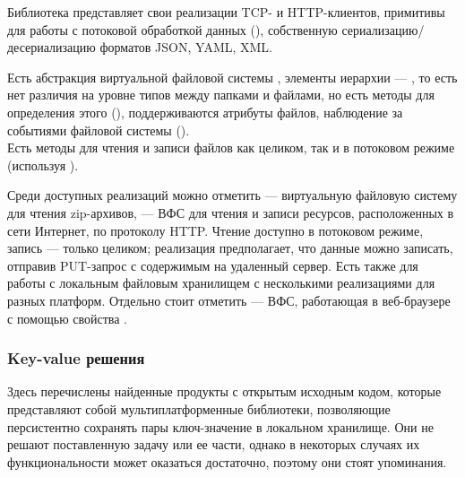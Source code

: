 \begin{itemize}
{        Библиотека представляет свои реализации TCP- и HTTP-клиентов, примитивы для работы с потоковой обработкой данных (), собственную сериализацию/десериализацию форматов JSON, YAML, XML.

        Есть абстракция виртуальной файловой системы , элементы иерархии --- , то есть нет различия на уровне типов между папками и файлами, но есть методы для определения этого (), поддерживаются атрибуты файлов, наблюдение за событиями файловой системы ().\\ Есть методы для чтения и записи файлов как целиком, так и в потоковом режиме (используя ).
        
        Среди доступных реализаций  можно отметить  --- виртуальную файловую систему для чтения zip-архивов,  --- ВФС для чтения и записи ресурсов, расположенных в сети Интернет, по протоколу HTTP. Чтение доступно в потоковом режиме, запись --- только целиком; реализация предполагает, что данные можно записать, отправив PUT-запрос с содержимым на удаленный сервер. Есть также  для работы с локальным файловым хранилищем с несколькими реализациями для разных платформ. Отдельно стоит отметить  --- ВФС, работающая в веб-браузере с помощью свойства .
      }
    \end{itemize}

  \subsubsection{Key-value решения}
    Здесь перечислены найденные продукты с открытым исходным кодом, которые представляют собой мультиплатформенные библиотеки, позволяющие персистентно сохранять пары ключ-значение в локальном хранилище. Они не решают поставленную задачу или ее части, однако в некоторых случаях их функциональности может оказаться достаточно, поэтому они стоят упоминания.


